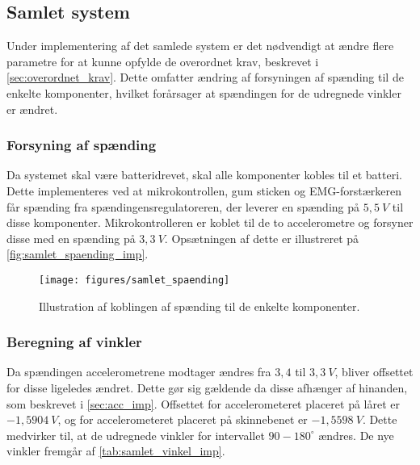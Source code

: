 \subsection{Samlet system}
Under implementering af det samlede system er det nødvendigt at ændre flere parametre for at kunne opfylde de overordnet krav, beskrevet i  \autoref{sec:overordnet_krav}. Dette omfatter ændring af forsyningen af spænding til de enkelte komponenter, hvilket forårsager at spændingen for de udregnede vinkler er ændret.

\subsubsection{Forsyning af spænding}
Da systemet skal være batteridrevet, skal alle komponenter kobles til et batteri. Dette implementeres ved at mikrokontrollen, gum sticken og EMG-forstærkeren får spænding fra spændingensregulatoreren, der leverer en spænding på $5,5~V$ til disse komponenter. Mikrokontrolleren er koblet til de to accelerometre og forsyner disse med en spænding på $3,3~V$. Opsætningen af dette er illustreret på \autoref{fig:samlet_spaending_imp}. 

\begin{figure}[H]
\centering
\texttt{[image: figures/samlet\_spaending]}
\caption{Illustration af koblingen af spænding til de enkelte komponenter.}
\label{fig:samlet_spaending_imp}
\end{figure}

\subsubsection{Beregning af vinkler}
Da spændingen accelerometrene modtager ændres fra $3,4$ til $3,3~V$, bliver offsettet for disse ligeledes ændret. Dette gør sig gældende da disse afhænger af hinanden, som  beskrevet i \autoref{sec:acc_imp}. Offsettet for accelerometeret placeret på låret er $-1,5904~V$, og for accelerometeret placeret på skinnebenet er $-1,5598~V$. Dette medvirker til, at de udregnede vinkler for intervallet $90-180^{\circ}$ ændres. De nye vinkler fremgår af \autoref{tab:samlet_vinkel_imp}. 

